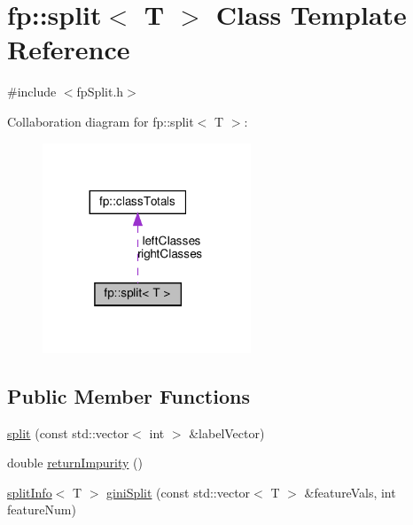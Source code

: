 \hypertarget{classfp_1_1split}{}\section{fp\+:\+:split$<$ T $>$ Class Template Reference}
\label{classfp_1_1split}


{\ttfamily \#include $<$fp\+Split.\+h$>$}



Collaboration diagram for fp\+:\+:split$<$ T $>$\+:\nopagebreak
\begin{figure}[H]
\begin{center}
\leavevmode
\includegraphics[width=176pt]{classfp_1_1split__coll__graph}
\end{center}
\end{figure}
\subsection*{Public Member Functions}
\begin{DoxyCompactItemize}
\item 
\hyperlink{classfp_1_1split_aa47c5cf1e4d7c99506b659df7ab75e14}{split} (const std\+::vector$<$ int $>$ \&label\+Vector)
\item 
double \hyperlink{classfp_1_1split_a8501016c02cb2c36b3d40ee120da872e}{return\+Impurity} ()
\item 
\hyperlink{classfp_1_1splitInfo}{split\+Info}$<$ T $>$ \hyperlink{classfp_1_1split_a6a98f17c8b3fc3b8047e4559f8b618b7}{gini\+Split} (const std\+::vector$<$ T $>$ \&feature\+Vals, int feature\+Num)
\end{DoxyCompactItemize}
